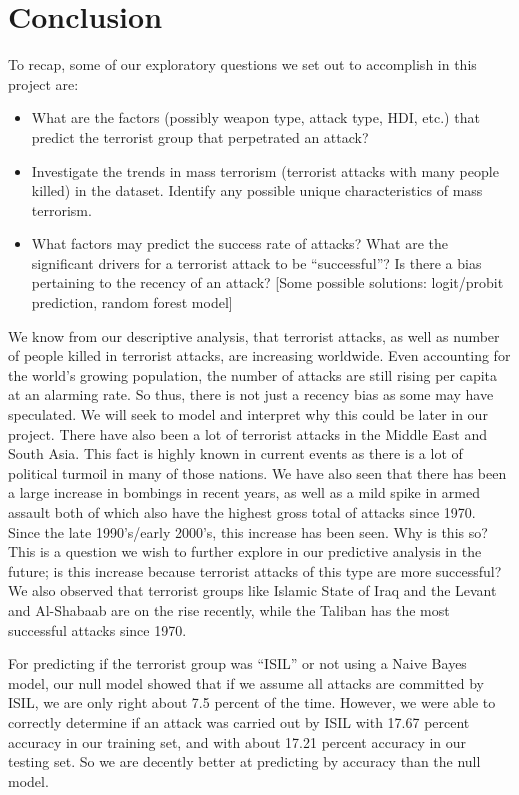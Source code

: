 \documentclass[11pt,letterpaper,]{article}
\providecommand{\tightlist}{%
  \setlength{\itemsep}{0pt}\setlength{\parskip}{0pt}}
\theoremstyle{definition}
\theoremstyle{definition}
\theoremstyle{definition}
\theoremstyle{remark}
\begin{document}
\section{Conclusion}\label{sec:conclusion}

To recap, some of our exploratory questions we set out to accomplish in
this project are:

\begin{itemize}
\tightlist
\item
  What are the factors (possibly weapon type, attack type, HDI, etc.)
  that predict the terrorist group that perpetrated an attack?
\item
  Investigate the trends in mass terrorism (terrorist attacks with many
  people killed) in the dataset. Identify any possible unique
  characteristics of mass terrorism.
\item
  What factors may predict the success rate of attacks? What are the
  significant drivers for a terrorist attack to be ``successful''? Is
  there a bias pertaining to the recency of an attack? {[}Some possible
  solutions: logit/probit prediction, random forest model{]}
\end{itemize}

We know from our descriptive analysis, that terrorist attacks, as well
as number of people killed in terrorist attacks, are increasing
worldwide. Even accounting for the world's growing population, the
number of attacks are still rising per capita at an alarming rate. So
thus, there is not just a recency bias as some may have speculated. We
will seek to model and interpret why this could be later in our project.
There have also been a lot of terrorist attacks in the Middle East and
South Asia. This fact is highly known in current events as there is a
lot of political turmoil in many of those nations. We have also seen
that there has been a large increase in bombings in recent years, as
well as a mild spike in armed assault both of which also have the
highest gross total of attacks since 1970. Since the late 1990's/early
2000's, this increase has been seen. Why is this so? This is a question
we wish to further explore in our predictive analysis in the future; is
this increase because terrorist attacks of this type are more
successful? We also observed that terrorist groups like Islamic State of
Iraq and the Levant and Al-Shabaab are on the rise recently, while the
Taliban has the most successful attacks since 1970.

For predicting if the terrorist group was ``ISIL'' or not using a Naive
Bayes model, our null model showed that if we assume all attacks are
committed by ISIL, we are only right about 7.5 percent of the time.
However, we were able to correctly determine if an attack was carried
out by ISIL with 17.67 percent accuracy in our training set, and with
about 17.21 percent accuracy in our testing set. So we are decently
better at predicting by accuracy than the null model.
\end{document}
